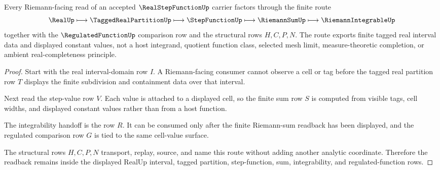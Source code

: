 \begin{theorem}
\label{thm:real-step-function-riemann-readback}
Every Riemann-facing read of an accepted $\RealStepFunctionUp$ carrier factors through the finite route
$$
\RealUp \longmapsto \TaggedRealPartitionUp \longmapsto \StepFunctionUp \longmapsto \RiemannSumUp \longmapsto \RiemannIntegrableUp
$$
together with the $\RegulatedFunctionUp$ comparison row and the structural rows $H,C,P,N$. The route exports finite tagged real interval data and displayed constant values, not a host integrand, quotient function class, selected mesh limit, measure-theoretic completion, or ambient real-completeness principle.
\end{theorem}
\begin{proof}
Start with the real interval-domain row $I$. A Riemann-facing consumer cannot observe a cell or tag before the tagged real partition row $T$ displays the finite subdivision and containment data over that interval.

Next read the step-value row $V$. Each value is attached to a displayed cell, so the finite sum row $S$ is computed from visible tags, cell widths, and displayed constant values rather than from a host function.

The integrability handoff is the row $R$. It can be consumed only after the finite Riemann-sum readback has been displayed, and the regulated comparison row $G$ is tied to the same cell-value surface.

The structural rows $H,C,P,N$ transport, replay, source, and name this route without adding another analytic coordinate. Therefore the readback remains inside the displayed RealUp interval, tagged partition, step-function, sum, integrability, and regulated-function rows.
\end{proof}



